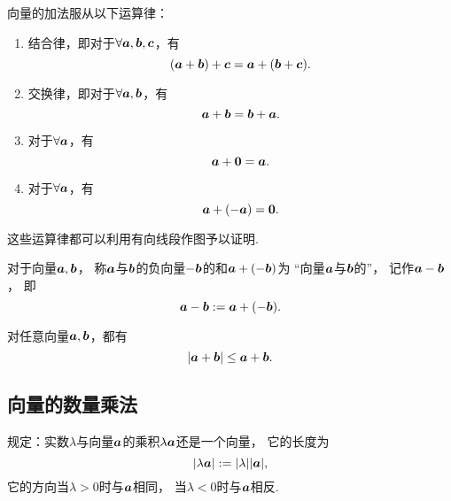 向量的加法服从以下运算律：
\begin{enumerate}
	\item 结合律，即对于\(\forall \boldsymbol{a},\boldsymbol{b},\boldsymbol{c}\)，有\begin{equation*}
		(\boldsymbol{a}+\boldsymbol{b})+\boldsymbol{c}
		= \boldsymbol{a}+(\boldsymbol{b}+\boldsymbol{c}).
	\end{equation*}

	\item 交换律，即对于\(\forall \boldsymbol{a},\boldsymbol{b}\)，有\begin{equation*}
		\boldsymbol{a}+\boldsymbol{b} = \boldsymbol{b}+\boldsymbol{a}.
	\end{equation*}

	\item 对于\(\forall \boldsymbol{a}\)，有\begin{equation*}
		\boldsymbol{a}+\boldsymbol{0}=\boldsymbol{a}.
	\end{equation*}

	\item 对于\(\forall \boldsymbol{a}\)，有\begin{equation*}
		\boldsymbol{a}+(-\boldsymbol{a})=\boldsymbol{0}.
	\end{equation*}
\end{enumerate}
这些运算律都可以利用有向线段作图予以证明.

\begin{definition}
对于向量\(\boldsymbol{a},\boldsymbol{b}\)，
称\(\boldsymbol{a}\)与\(\boldsymbol{b}\)的负向量\(-\boldsymbol{b}\)的和\(\boldsymbol{a}+(-\boldsymbol{b})\)为
“向量\(\boldsymbol{a}\)与\(\boldsymbol{b}\)的”，
记作\(\boldsymbol{a}-\boldsymbol{b}\)，
即\begin{equation*}
	\boldsymbol{a}-\boldsymbol{b}
	:=
	\boldsymbol{a}+(-\boldsymbol{b}).
\end{equation*}
\end{definition}

\begin{theorem}
对任意向量\(\boldsymbol{a},\boldsymbol{b}\)，都有\begin{equation*}
	\abs{\boldsymbol{a}+\boldsymbol{b}} \leq \boldsymbol{a} + \boldsymbol{b}.
\end{equation*}
\end{theorem}

\subsection{向量的数量乘法}
\begin{definition}
规定：实数\(\lambda\)与向量\(\boldsymbol{a}\)的乘积\(\lambda \boldsymbol{a}\)还是一个向量，
它的长度为\begin{equation*}
\abs{\lambda\boldsymbol{a}}
:=
\abs{\lambda} \abs{\boldsymbol{a}},
\end{equation*}
它的方向当\(\lambda>0\)时与\(\boldsymbol{a}\)相同，
当\(\lambda<0\)时与\(\boldsymbol{a}\)相反.
\end{definition}

